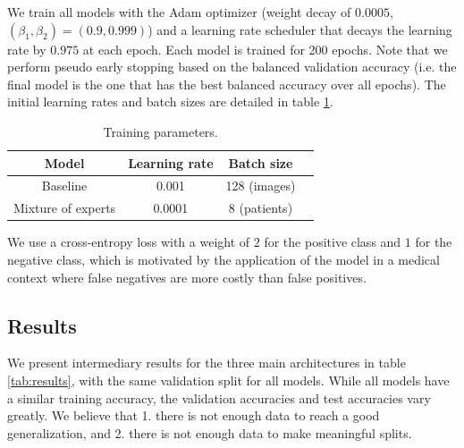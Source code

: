 \documentclass{midl}
\begin{document}
We train all models with the Adam optimizer (weight decay of $0.0005$, $(\beta_1,\beta_2)=(0.9, 0.999)$) and a learning rate scheduler that decays the learning rate by $0.975$ at each epoch. Each model is trained for 200 epochs. Note that we perform pseudo early stopping based on the balanced validation accuracy (i.e. the final model is the one that has the best balanced accuracy over all epochs). The initial learning rates and batch sizes are detailed in table \ref{tab:training_parameters}.
\begin{table}[H]
    \begin{center}
        \begin{tabular}{|c|c|c|c|}
            \hline
            \textbf{Model}     & \textbf{Learning rate} & \textbf{Batch size} \\
            \hline
            Baseline           & 0.001                  & 128 (images)        \\
            \hline
            Mixture of experts & 0.0001                 & 8 (patients)        \\
            \hline
        \end{tabular}
    \end{center}
    \vspace*{-\baselineskip}
    \caption{Training parameters.}
    \label{tab:training_parameters}
\end{table}
We use a cross-entropy loss with a weight of $2$ for the positive class and $1$ for the negative class, which is motivated by the application of the model in a medical context where false negatives are more costly than false positives.

\subsection{Results}

We present intermediary results for the three main architectures in table \ref{tab:results}, with the same validation split for all models. While all models have a similar training accuracy, the validation accuracies and test accuracies vary greatly. We believe that 1. there is not enough data to reach a good generalization, and 2. there is not enough data to make meaningful splits.
\end{document}
